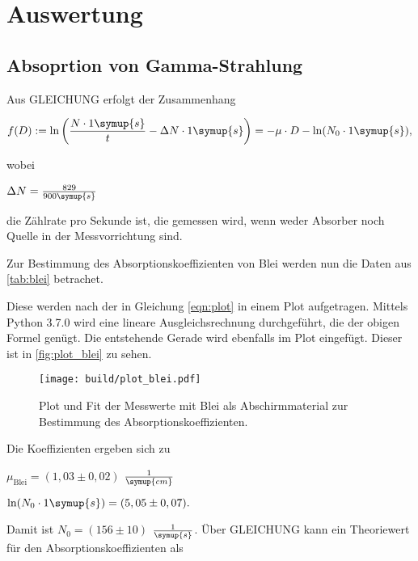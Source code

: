 \section{Auswertung}
\label{sec:Auswertung}

\subsection{Absoprtion von Gamma-Strahlung}

Aus GLEICHUNG erfolgt der Zusammenhang

\begin{equation}
    \label{eqn:plot}
    f(D) := \ln \bigg (\frac{ N \cdot 1 \symup{s}}{t} - \Delta N \cdot 1 \symup{s} \bigg) = - \mu \cdot D - \ln (N_0 \cdot 1 \symup{s}),
\end{equation}

wobei

\begin{center}
    $\Delta N = \frac{829}{900 \symup{s}}$
\end{center}

die Zählrate pro Sekunde ist, die gemessen wird, wenn weder Absorber noch Quelle in der Messvorrichtung sind.

Zur Bestimmung des Absorptionskoeffizienten von Blei werden nun die Daten aus \autoref{tab:blei} betrachet.



Diese werden nach der in Gleichung \eqref{eqn:plot} in einem Plot aufgetragen.
Mittels Python 3.7.0 wird eine lineare Ausgleichsrechnung durchgeführt, die der obigen Formel genügt.
Die entstehende Gerade wird ebenfalls im Plot eingefügt.
Dieser ist in \autoref{fig:plot_blei} zu sehen.

\begin{figure}
    \centering
    \texttt{[image: build/plot\_blei.pdf]}
    \caption{Plot und Fit der Messwerte mit Blei als Abschirmmaterial zur Bestimmung des Absorptionskoeffizienten.}
    \label{fig:plot_blei}
\end{figure}

Die Koeffizienten ergeben sich zu 

\begin{center}
    $\mu_\text{Blei} = (1,03 \pm 0,02)$ $\frac{1}{\symup{cm}}$

    $\ln ( N_ 0 \cdot 1 \symup{s}) = (5,05 \pm 0,07).$
\end{center}

Damit ist $N_0 = (156 \pm 10)$ $\frac{1}{\symup{s}}$.
Über GLEICHUNG kann ein Theoriewert für den Absorptionskoeffizienten als

